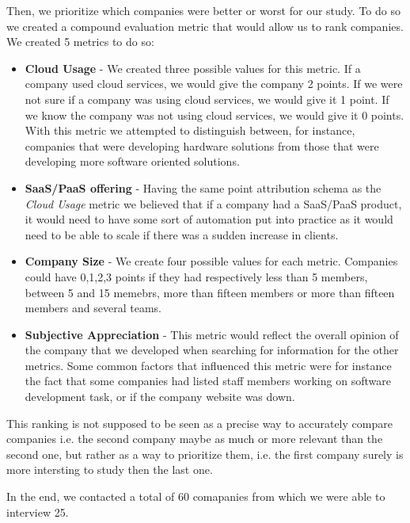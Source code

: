       Then, we prioritize which companies were better or worst for our study. To do so we created a compound evaluation metric that would allow us to rank companies. We created 5 metrics to do so:
      \begin{itemize}
        \item \textbf{Cloud Usage} - We created three possible values for this metric. If a company used cloud services, we would give the company 2 points. If we were not sure if a company was using cloud services, we would give it 1 point. If we know the company was not using cloud services, we would give it 0 points. With this metric we attempted to distinguish between, for instance, companies that were developing hardware solutions from those that were developing more software oriented solutions.

        \item \textbf{SaaS/PaaS offering} - Having the same point attribution schema as the \textit{Cloud Usage} metric we believed that if a company had a SaaS/PaaS product, it would need to have some sort of automation put into practice as it would need to be able to scale if there was a sudden increase in clients.

        \item \textbf{Company Size} - We create four possible values for each metric. Companies could have 0,1,2,3 points if they had respectively less than 5 members, between 5 and 15 memebrs, more than fifteen members or more than fifteen members and several teams.

        \item \textbf{Subjective Appreciation} - This metric would reflect the overall opinion of the company that we developed when searching for information for the other metrics. Some common factors that influenced this metric were for instance the fact that some companies had listed staff members working on software development task, or if the company website was down.
      \end{itemize}

      This ranking is not supposed to be seen as a precise way to accurately compare companies i.e. the second company maybe as much or more relevant than the second one, but rather as a way to prioritize them, i.e. the first company surely is more intersting to study then the last one.

      In the end, we contacted a total of 60 comapanies from which we were able to interview 25.

